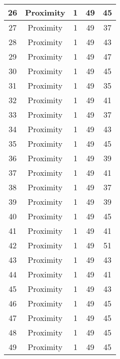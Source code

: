 \documentclass[results.tex]{subfiles}
\begin{document}
\begin{center}
\begin{tabular}{| c || c | c | c | c |}
    \hline
    26 & Proximity & 1 & 49 & 45 \\ 
    \hline
    27 & Proximity & 1 & 49 & 37 \\ 
    \hline
    28 & Proximity & 1 & 49 & 43 \\ 
    \hline
    29 & Proximity & 1 & 49 & 47 \\ 
    \hline
    30 & Proximity & 1 & 49 & 45 \\ 
    \hline
    31 & Proximity & 1 & 49 & 35 \\ 
    \hline
    32 & Proximity & 1 & 49 & 41 \\ 
    \hline
    33 & Proximity & 1 & 49 & 37 \\ 
    \hline
    34 & Proximity & 1 & 49 & 43 \\ 
    \hline
    35 & Proximity & 1 & 49 & 45 \\ 
    \hline
    36 & Proximity & 1 & 49 & 39 \\ 
    \hline
    37 & Proximity & 1 & 49 & 41 \\ 
    \hline
    38 & Proximity & 1 & 49 & 37 \\ 
    \hline
    39 & Proximity & 1 & 49 & 39 \\ 
    \hline
    40 & Proximity & 1 & 49 & 45 \\ 
    \hline
    41 & Proximity & 1 & 49 & 41 \\ 
    \hline
    42 & Proximity & 1 & 49 & 51 \\ 
    \hline
    43 & Proximity & 1 & 49 & 43 \\ 
    \hline
    44 & Proximity & 1 & 49 & 41 \\ 
    \hline
    45 & Proximity & 1 & 49 & 43 \\ 
    \hline
    46 & Proximity & 1 & 49 & 45 \\ 
    \hline
    47 & Proximity & 1 & 49 & 45 \\ 
    \hline
    48 & Proximity & 1 & 49 & 45 \\ 
    \hline
    49 & Proximity & 1 & 49 & 45 \\ 
    \hline   \end{tabular}
\end{center}
\end{document}
